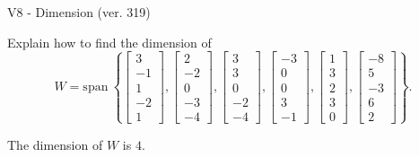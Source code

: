 \begin{exercise}
  \begin{exerciseTitle}V8 - Dimension (ver. 319)\end{exerciseTitle}
  \begin{exerciseStatement}
    Explain how to find the dimension of 
\[W=\mathrm{span}\ \left\{\left[\begin{array}{r}
3 \\
-1 \\
1 \\
-2 \\
1
\end{array}\right] , \left[\begin{array}{r}
2 \\
-2 \\
0 \\
-3 \\
-4
\end{array}\right] , \left[\begin{array}{r}
3 \\
3 \\
0 \\
-2 \\
-4
\end{array}\right] , \left[\begin{array}{r}
-3 \\
0 \\
0 \\
3 \\
-1
\end{array}\right] , \left[\begin{array}{r}
1 \\
3 \\
2 \\
3 \\
0
\end{array}\right] , \left[\begin{array}{r}
-8 \\
5 \\
-3 \\
6 \\
2
\end{array}\right]\right\}.\]



  \end{exerciseStatement}
  \begin{exerciseAnswer}
   The dimension of \(W\) is  \(4\).
  


  \end{exerciseAnswer}
\end{exercise}